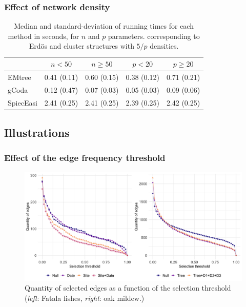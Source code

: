 \subsubsection{Effect of network density}

\begin{table}[H]
\centering
\begin{tabular}{l|rr|rr}
    & \multicolumn{1}{c}{$n < 50$} & \multicolumn{1}{c}{$n\geq 50$} & \multicolumn{1}{c}{$p < 20$} & \multicolumn{1}{c}{$p\geq 20$} \\  \hline
  EMtree    &   0.41 (0.11)	&   0.60 (0.15) &   0.38 (0.12) &    0.71 (0.21)      \\ 
  gCoda     &   0.12 (0.47)	&   0.07 (0.03) &   0.05 (0.03) &    0.09 (0.06)     \\ 
  SpiecEasi &   2.41 (0.25)	&   2.41 (0.25) &   2.39 (0.25) &    2.42 (0.25)      \\ 
   \hline
\end{tabular}
\caption{Median and standard-deviation of running times for each method in seconds, for $n$ and $p$ parameters. corresponding to Erdös and cluster structures with $5/p$ densities.}
\label{timeDenser}
\end{table}

\newpage
\subsection{Illustrations}
\subsubsection{Effect of the edge frequency threshold}

\begin{figure}[H]
    \centering
    \includegraphics[width=\linewidth]{figs/QET_twoDataSets.png}
    \caption{Quantity of selected edges as a function of the selection threshold (\textit{left}: Fatala fishes, \textit{right}: oak mildew.)}
    \label{QETOak}
\end{figure}


